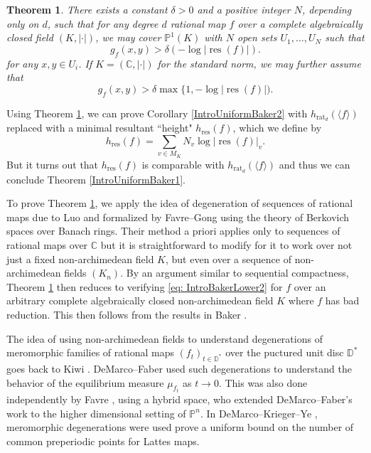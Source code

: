 \documentclass[10pt]{amsart}
\newcommand{\bb}{\mathbb}
\newcommand{\res}{\operatorname{res}}
\newcommand{\rat}{\operatorname{rat}}
\newtheorem{theorem}{Theorem}
\numberwithin{theorem}{section}
\numberwithin{example}{section}
\numberwithin{definition}{section}
\begin{document}
\begin{theorem} \label{IntroUniformBaker3}
There exists a constant $\delta > 0$ and a positive integer $N$, depending only on $d$, such that for any degree $d$ rational map $f$ over a complete algebraically closed field $(K, | \cdot |)$, we may cover $\bb{P}^1(K)$ with $N$ open sets $U_1,\ldots,U_N$ such that 
$$g_{f}(x,y) > \delta (-\log |\res(f)|).$$ 
for any $x,y \in U_i$. If $K = (\bb{C}, | \cdot |)$ for the standard norm, we may further assume that 
$$g_f(x,y) > \delta \max\{1, -\log |\res(f)|).$$
\end{theorem}

Using Theorem \ref{IntroUniformBaker3}, we can prove Corollary \ref{IntroUniformBaker2} with $h_{\rat_d}(\langle f \rangle)$ replaced with a minimal resultant ``height" $h_{\res}(f)$, which we define by 
$$h_{\res}(f) = \sum_{v \in M_K} N_v \log|\res(f)|_v.$$
But it turns out that $h_{\res}(f)$ is comparable with $h_{\rat_d}(\langle f \rangle)$ and thus we can conclude Theorem \ref{IntroUniformBaker1}.
\par 
To prove Theorem \ref{IntroUniformBaker3}, we apply the idea of degeneration of sequences of rational maps due to Luo \cite{Luo21, Luo22} and formalized by Favre--Gong \cite{FG24} using the theory of Berkovich spaces over Banach rings. Their method a priori applies only to sequences of rational maps over $\bb{C}$ but it is straightforward to modify for it to work over not just a fixed non-archimedean field $K$, but even over a sequence of non-archimedean fields $(K_n)$. By an argument similar to sequential compactness, Theorem \ref{IntroUniformBaker3} then reduces to verifying \eqref{eq: IntroBakerLower2} for $f$ over an arbitrary complete algebraically closed non-archimedean field $K$ where $f$ has bad reduction. This then follows from the results in Baker \cite{Bak09}.
\par 
The idea of using non-archimedean fields to understand degenerations of meromorphic families of rational maps $(f_t)_{t \in \bb{D}^{*}}$ over the puctured unit disc $\bb{D}^{*}$ goes back to Kiwi \cite{Kiw06, Kiw14}. DeMarco--Faber \cite{DF14, DF16} used such degenerations to understand the behavior of the equilibrium measure $\mu_{f_t}$ as $t \to 0$. This was also done independently by Favre \cite{Fav20}, using a hybrid space, who extended DeMarco--Faber's work to the higher dimensional setting of $\bb{P}^n$. In DeMarco--Krieger--Ye \cite{DKY20}, meromorphic degenerations were used prove a uniform bound on the number of common preperiodic points for Lattes maps. 
\par 
\end{document}
